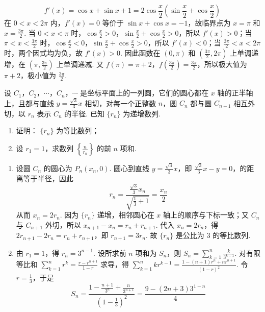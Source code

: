 \begin{solution}
\[
f'(x)=\cos x+\sin x+1=2\cos\frac{x}{2}\left(\sin\frac{x}{2}+\cos\frac{x}{2}\right)
\]
在 \(0<x<2\pi\) 内，\(f'(x)=0\) 等价于 \(\sin x+\cos x=-1\)，故临界点为 \(x=\pi\) 和 \(x=\frac{3\pi}{2}\). 当 \(0<x<\pi\) 时，\(\cos\frac{x}{2}>0\)，\(\sin\frac{x}{2}+\cos\frac{x}{2}>0\)，所以 \(f'(x)>0\)；当 \(\pi<x<\frac{3\pi}{2}\) 时，\(\cos\frac{x}{2}<0\)，\(\sin\frac{x}{2}+\cos\frac{x}{2}>0\)，所以 \(f'(x)<0\)；当 \(\frac{3\pi}{2}<x<2\pi\) 时，两个因式均为负，故 \(f'(x)>0\). 因此函数在 \((0,\pi)\) 和 \(\left(\frac{3\pi}{2},2\pi\right)\) 上单调递增，在 \(\left(\pi,\frac{3\pi}{2}\right)\) 上单调递减. 又 \(f(\pi)=\pi+2\)，\(f\left(\frac{3\pi}{2}\right)=\frac{3\pi}{2}\)，所以极大值为 \(\pi+2\)，极小值为 \(\frac{3\pi}{2}\).
\end{solution}

\begin{problem}
设 \(C_{1}\)，\(C_{2}\)，\(\cdots\)，\(C_{n}\)，\(\cdots\) 是坐标平面上的一列圆，它们的圆心都在 \(x\) 轴的正半轴上，且都与直线 \(y = \frac{\sqrt{3}}{3}x\) 相切，对每一个正整数 \(n\)，圆 \(C_{n}\) 都与圆 \(C_{n+1}\) 相互外切，以 \(r_{n}\) 表示 \(C_{n}\) 的半径. 已知 \(\{r_{n}\}\) 为递增数列.

\begin{enumerate}
\item 证明： \(\{r_{n}\}\) 为等比数列；
\item 设 \(r_1 = 1\)，求数列 \(\left\{\frac{n}{r_n}\right\}\) 的前 \(n\) 项和.
\end{enumerate}

\end{problem}

\begin{solution}
\begin{enumerate}
\item 设圆 \(C_n\) 的圆心为 \(P_n(x_n,0)\). 圆心到直线 \(y=\frac{\sqrt3}{3}x\)，即 \(\frac{\sqrt3}{3}x-y=0\)，的距离等于半径，因此
\[
r_n=\frac{\frac{\sqrt3}{3}x_n}{\sqrt{\frac13+1}}=\frac{x_n}{2}
\]
从而 \(x_n=2r_n\). 因为 \(\{r_n\}\) 递增，相邻圆心在 \(x\) 轴上的顺序与下标一致；又 \(C_n\) 与 \(C_{n+1}\) 外切，所以 \(x_{n+1}-x_n=r_n+r_{n+1}\). 代入 \(x_n=2r_n\)，得 \(2r_{n+1}-2r_n=r_n+r_{n+1}\)，即 \(r_{n+1}=3r_n\). 故 \(\{r_n\}\) 是公比为 \(3\) 的等比数列.
\item 由 \(r_1=1\)，得 \(r_n=3^{n-1}\). 设所求前 \(n\) 项和为 \(S_n\)，则 \(S_n=\sum_{k=1}^{n}\frac{k}{3^{k-1}}\). 对有限等比和 \(\sum_{k=1}^{n}r^k=\frac{r-r^{n+1}}{1-r}\) 求导，得 \(\sum_{k=1}^{n}kr^{k-1}=\frac{1-(n+1)r^n+nr^{n+1}}{(1-r)^2}\). 令 \(r=\frac13\)，于是
\[
S_n=\frac{1-\frac{n+1}{3^n}+\frac{n}{3^{n+1}}}{(1-\frac13)^2}=\frac{9-(2n+3)3^{1-n}}{4}
\]
\end{enumerate}
\end{solution}
